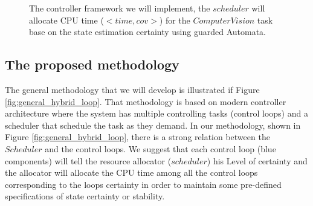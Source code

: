 \documentclass[11pt]{article}
\begin{document}
\begin{figure}[h]
    \centering
    
    \caption{The controller framework we will implement, the $scheduler$ will allocate CPU time ($<time,cov>$) for the  $Computer Vision$ task base on the state estimation certainty using guarded Automata.
    \label{fig:hybrid loop}}
\end{figure}

\subsection{The proposed methodology}
\label{sec:our proposal}

The general methodology that we will develop is illustrated if Figure \ref{fig:general_hybrid_loop}.
That methodology is based on modern controller architecture where the system has multiple controlling tasks (control loops) and a scheduler that schedule the task as they demand.
In our methodology, shown in Figure \ref{fig:general_hybrid_loop}, there is a strong relation between the $Scheduler$ and the control loops. We suggest that each control loop (blue components) will tell the resource allocator ($scheduler$) his Level of certainty and the allocator will allocate the CPU time among all the control loops corresponding to the loops certainty in order to maintain some pre-defined specifications of state certainty or stability.
\end{document}
